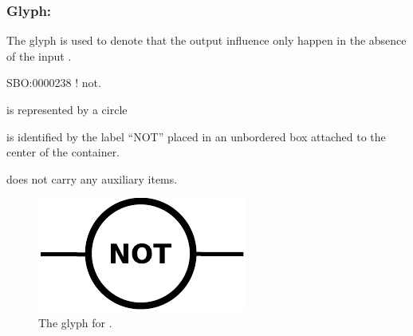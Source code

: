 \color{blue}
\subsubsection{Glyph: }\label{sec:not}

The glyph  is used to denote that the output influence only happen in the absence of the input .

\begin{glyphDescription}

 \glyphSboTerm SBO:0000238 ! not.

 \glyphContainer {} is represented by a circle

  \glyphLabel {} is identified by the label ``NOT'' placed in an unbordered box attached to the center of the container. 

  \glyphAux {} does not carry any auxiliary items.

\end{glyphDescription}

\begin{figure}[H]
  \centering
  \includegraphics[scale = 0.5]{images/not}
  \caption{The \ER glyph for .}
  \label{fig:not}
\end{figure}

